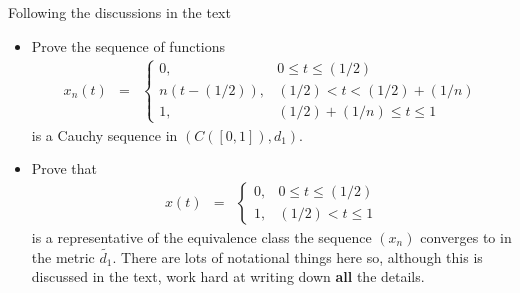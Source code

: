 \documentclass[11pt]{SelfArxOneColBMN}
\begin{document}
\begin{exercise}
Following the discussions in the text
\begin{itemize}
\item Prove the sequence of functions
\begin{eqnarray*}
x_n(t) &=&
\left \{
\begin{array}{ll}
0, & 0 \leq t \leq (1/2)\\
n(t - (1/2)), & (1/2) < t < (1/2) + (1/n)\\
1, & (1/2) + (1/n) \leq t \leq 1
\end{array}
\right .
\end{eqnarray*}
\noindent
is a Cauchy sequence in $(C([0,1]), d_1)$.
\item Prove that
\begin{eqnarray*}
x(t) &=&
\left \{
\begin{array}{ll}
0, & 0 \leq t \leq (1/2)\\
1, & (1/2)  < t \leq 1
\end{array}
\right .
\end{eqnarray*}
\noindent
is a representative of the equivalence class the
sequence $(x_n)$ converges to in the
metric $\widetilde{d_1}$.  There are lots of
notational things here so, although this is discussed
in the text, work hard at writing down {\bf all} the
details.
\end{itemize}
\end{exercise}
\end{document}
